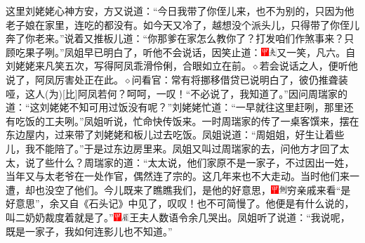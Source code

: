 这里刘姥姥心神方安，方又说道：“今日我带了你侄儿来，也不为别的，只因为他老子娘在家里，连吃的都没有。如今天又冷了，越想没个派头儿，只得带了你侄儿奔了你老来。”说着又推板儿道：“你那爹在家怎么教你了？打发咱们作煞事来？只顾吃果子咧。”凤姐早已明白了，听他不会说话，因笑止道：{{\includegraphics[width=3mm]{../Images/00002}\includegraphics[width=3mm]{../Images/00012}\footnotesize \kaishu 又一笑，凡六。自刘姥姥来凡笑五次，写得阿凤乖滑伶俐，合眼如立在前。{$\diamond$}若会说话之人，便听他说了，阿凤厉害处正在此。{$\diamond$}问看官：常有将挪移借贷已说明白了，彼仍推聋装哑，这人{(为)}{[}比{]}阿凤若何？呵呵，一叹！}}“不必说了，我知道了。”因问周瑞家的道：“这刘姥姥不知可用过饭没有呢？”刘姥姥忙道：“一早就往这里赶咧，那里还有吃饭的工夫咧。”凤姐听说，忙命快传饭来。一时周瑞家的传了一桌客馔来，摆在东边屋内，过来带了刘姥姥和板儿过去吃饭。凤姐说道：“周姐姐，好生让着些儿，我不能陪了。”于是过东边房里来。凤姐又叫过周瑞家的去，问他方才回了太太，说了些什么？周瑞家的道：“太太说，他们家原不是一家子，不过因出一姓，当年又与太老爷在一处作官，偶然连了宗的。这几年来也不大走动。当时他们来一遭，却也没空了他们。今儿既来了瞧瞧我们，是他的好意思，{\includegraphics[width=3mm]{../Images/00002}\includegraphics[width=3mm]{../Images/00011}\footnotesize \kaishu 穷亲戚来看“是好意思”，余又自《石头记》中见了，叹叹！}也不可简慢了。他便是有什么说的，叫二奶奶裁度着就是了。”{\includegraphics[width=3mm]{../Images/00002}\includegraphics[width=3mm]{../Images/00010}\footnotesize \kaishu 王夫人数语令余几哭出。}凤姐听了说道：“我说呢，既是一家子，我如何连影儿也不知道。”

